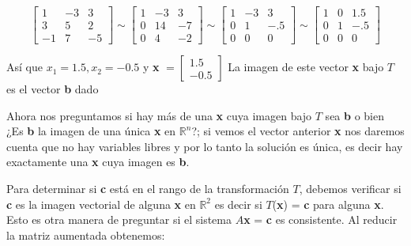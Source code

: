 \documentclass[12 pt]{article}
\begin{document}
\begin{equation*}
    \left[\begin{array}{rr|r}
    1 & -3 & 3 \\
    3 & 5 & 2 \\
    -1 & 7 & -5
    \end{array}\right] \sim\left[\begin{array}{rr|r}
    1 & -3 & 3 \\
    0 & 14 & -7 \\
    0 & 4 & -2
    \end{array}\right] \sim\left[\begin{array}{rr|r}
    1 & -3 & 3 \\
    0 & 1 & -.5 \\
    0 & 0 & 0
    \end{array}\right] \sim\left[\begin{array}{rr|r}
    1 & 0 & 1.5 \\
    0 & 1 & -.5 \\
    0 & 0 & 0
    \end{array}\right]
\end{equation*}

Así que $x_1 = 1.5, x_2 = -0.5$ y \textbf{x} $= \left[\begin{array}{c} 1.5 \\ -0.5 \end{array}\right]$ La imagen de este vector \textbf{x} bajo $T$ es el vector \textbf{b} dado

Ahora nos preguntamos si hay más de una \textbf{x} cuya imagen bajo $T$ sea \textbf{b} o bien ¿Es \textbf{b} la imagen de una única \textbf{x} en $\mathbb{R}^n$?; si vemos el vector anterior \textbf{x} nos daremos cuenta que no hay variables libres y por lo tanto la solución es única, es decir hay exactamente una \textbf{x} cuya imagen es \textbf{b}.

Para determinar si \textbf{c} está en el rango de la transformación $T$, debemos verificar si \textbf{c} es la imagen vectorial de alguna \textbf{x} en $\mathbb{R}^2$ es decir si $T$(\textbf{x}) = \textbf{c} para alguna \textbf{x}. Esto es otra manera de preguntar si el sistema $A$\textbf{x} = \textbf{c} es consistente. Al reducir la matriz aumentada obtenemos:
\end{document}
